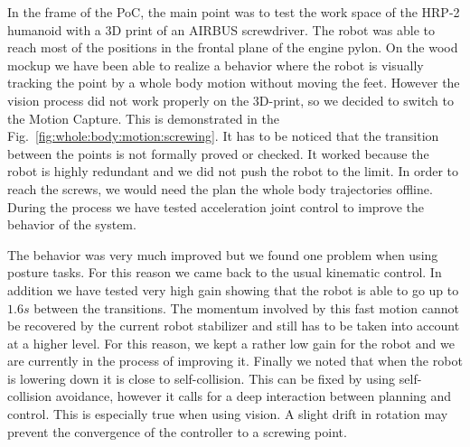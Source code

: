 In the frame of the PoC, the main point was to test the work space of the HRP-2 humanoid with a 3D print of an AIRBUS screwdriver.
The robot was able to reach most of the positions in the frontal plane of the engine pylon. 
On the wood mockup we have been able to realize a behavior where the robot is visually tracking the point by a whole body motion without moving the feet.
However the vision process did not work properly on the 3D-print, so we decided to switch to the Motion Capture.
This is demonstrated in the Fig.~\ref{fig:whole:body:motion:screwing}. 
It has to be noticed that the transition between the points is not formally proved or checked. 
It worked because the robot is highly redundant and we did not push the robot to the limit.
In order to reach the screws, we would need the plan the whole body trajectories offline.
During the process we have tested acceleration joint control to improve the behavior of the system.

The behavior was very much improved but we found one problem when using posture tasks. 
For this reason we came back to the usual kinematic control.
In addition we have tested very high gain showing that the robot is able to go up to $1.6 s$ between the transitions. 
The momentum involved by this fast motion cannot be recovered by the current robot stabilizer and still has to be taken into account at a higher level.
For this reason, we kept a rather low gain for the robot and 
we are currently in the process of improving it.
Finally we noted that when the robot is lowering down it is close to self-collision. 
This can be fixed by using self-collision avoidance, however it calls for a deep interaction between planning and control.
This is especially true when using vision. A slight drift in rotation may prevent the convergence
of the controller to a screwing point.


